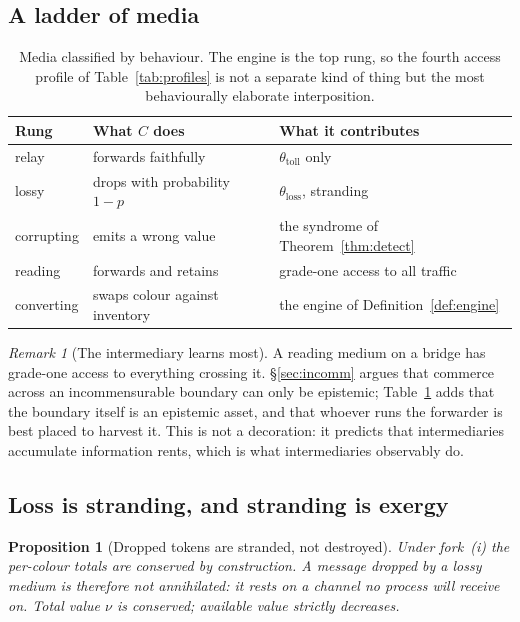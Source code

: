 \documentclass[11pt]{article}
\theoremstyle{plain}
\newtheorem{proposition}[theorem]{Proposition}
\theoremstyle{definition}
\theoremstyle{remark}
\newtheorem{remark}[theorem]{Remark}
\begin{document}
\subsection{A ladder of media}

\begin{table}[t]
\centering\small
\begin{tabular}{@{}lll@{}}
\toprule
\textbf{Rung} & \textbf{What $C$ does} & \textbf{What it contributes} \\
\midrule
relay      & forwards faithfully            & $\theta_{\mathrm{toll}}$ only \\
lossy      & drops with probability $1-p$   & $\theta_{\mathrm{loss}}$,
                                              stranding \\
corrupting & emits a wrong value            & the syndrome of
                                              Theorem~\ref{thm:detect} \\
reading    & forwards and retains           & grade-one access to all
                                              traffic \\
converting & swaps colour against inventory & the engine of
                                              Definition~\ref{def:engine} \\
\bottomrule
\end{tabular}
\caption{Media classified by behaviour. The engine is the top rung, so the
fourth access profile of Table~\ref{tab:profiles} is not a separate kind of
thing but the most behaviourally elaborate interposition.}
\label{tab:ladder}
\end{table}

\begin{remark}[The intermediary learns most]
A reading medium on a bridge has grade-one access to everything crossing
it. \S\ref{sec:incomm} argues that commerce across an incommensurable
boundary can only be epistemic; Table~\ref{tab:ladder} adds that the
boundary itself is an epistemic asset, and that whoever runs the forwarder
is best placed to harvest it. This is not a decoration: it predicts that
intermediaries accumulate information rents, which is what intermediaries
observably do.
\end{remark}

\subsection{Loss is stranding, and stranding is exergy}

\begin{proposition}[Dropped tokens are stranded, not destroyed]
\label{prop:strand}
Under fork~(i) the per-colour totals are conserved by construction. A
message dropped by a lossy medium is therefore not annihilated: it rests on
a channel no process will receive on. Total value $\nu$ is conserved;
\emph{available} value strictly decreases.
\end{proposition}
\end{document}
